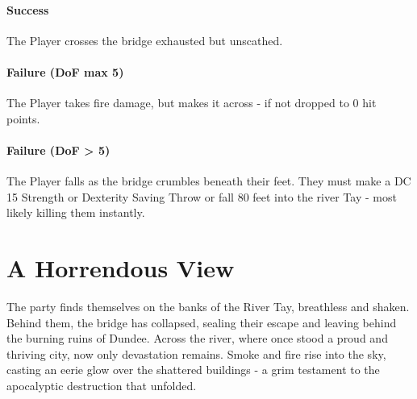 \paragraph*{Success}
{\entryfont The Player crosses the bridge exhausted but unscathed.}
\paragraph*{Failure (DoF max 5)}
{\entryfont The Player takes  fire damage, but makes it across - if not dropped to 0 hit points.}
\paragraph*{Failure (DoF > 5)}
{\entryfont The Player falls as the bridge crumbles beneath their feet. They must make a DC 15 Strength or Dexterity Saving Throw or fall 80 feet into the river Tay - most likely killing them instantly.}

\section*{A Horrendous View}

{\entryfont The party finds themselves on the banks of the River Tay, breathless and shaken. Behind them, the bridge has collapsed, sealing their escape and leaving behind the burning ruins of Dundee. Across the river, where once stood a proud and thriving city, now only devastation remains. Smoke and fire rise into the sky, casting an eerie glow over the shattered buildings - a grim testament to the apocalyptic destruction that unfolded.}

